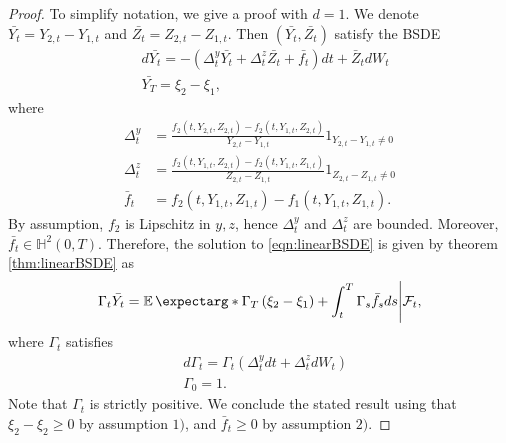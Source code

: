\begin{proof}
	To simplify notation, we give a proof with $d=1$.
	We denote $\bar{Y_t}=Y_{2,t}-Y_{1,t}$ and $\bar{Z_t}=Z_{2,t}-Z_{1,t}$. Then $(\bar{Y_t},\bar{Z_t})$ satisfy the BSDE
\begin{equation}
	\label{eqn:linearBSDE}
	\begin{split}
		&d \bar{Y_t}=-\left(\Delta_t^y \bar{Y_t}+\Delta_t^z \bar{Z_t}+\bar{f_t}\right) d t+\bar{Z}_t dW_t\\
		&\bar{Y_T}=\xi_2-\xi_1,
	\end{split}
\end{equation}
where 
\begin{equation}
	\begin{aligned}
		\Delta_t^y & =\frac{f_2\left(t, Y_{2,t}, Z_{2,t}\right)-f_2\left(t, Y_{1,t}, Z_{2,t}\right)}{Y_{2,t}-Y_{1,t}} 1_{Y_{2,t}-Y_{1,t} \neq 0} \\
		\Delta_t^z & =\frac{f_2\left(t, Y_{1,t}, Z_{2,t}\right)-f_2\left(t, Y_{1,t}, Z_{1,t}\right)}{Z_{2,t}-Z_{1,t}} 1_{Z_{2,t}-Z_{1,t} \neq 0} \\
		\bar{f}_t & =f_2\left(t, Y_{1,t}, Z_{1,t}\right)-f_1\left(t, Y_{1,t}, Z_{1,t}\right) .
	\end{aligned}
\end{equation}
By assumption, $f_2$ is Lipschitz in $y,z$, hence $\Delta_t^y$ and $\Delta_t^z$ are bounded. Moreover, $\bar{f_t}\in \mathbb{H}^2(0,T)$. Therefore, the solution to \eqref{eqn:linearBSDE} is given by theorem \ref{thm:linearBSDE} as
\begin{equation}
	\Gamma_t \bar{Y_t}=\expect*{\Gamma_T\left(\xi_2-\xi_1\right)+\int_t^T \Gamma_s \bar{f_s} d s \Bigg| \mathcal{F}_t},
\end{equation} 
where $\Gamma_t$ satisfies 
\begin{equation}
	\begin{split}
		&d\Gamma_t=\Gamma_{t}(\Delta_t^y dt + \Delta_t^z dW_t )\\
		&\Gamma_0=1.
	\end{split}
\end{equation}
Note that $\Gamma_t$ is strictly positive. We conclude the stated result using that $\xi_2-\xi_2\geq 0$ by assumption $1)$, and $\bar{f}_t\geq 0$ by assumption $2)$.

\end{proof}

